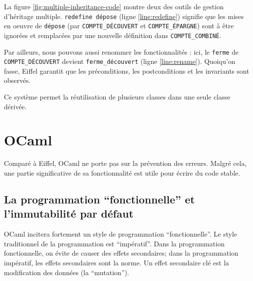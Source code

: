 \documentclass[french]{report}
\begin{document}
La figure \ref{fig:multiple-inheritance-code} montre deux des outils de gestion d'héritage multiple. \texttt{redefine dépose} (ligne \ref{line:redefine}) signifie que les mises en oeuvre de \texttt{dépose} (par \texttt{COMPTE\_DÉCOUVERT} et \texttt{COMPTE\_ÉPARGNE}) sont à être ignorées et remplacées par une nouvelle définition dans \texttt{COMPTE\_COMBINÉ}.

Par ailleurs, nous pouvons aussi renommer les fonctionnalités : ici, le \texttt{ferme} de \texttt{COMPTE\_DÉCOUVERT} devient \texttt{ferme\_découvert} (ligne \ref{line:rename}). Quoiqu'on fasse, Eiffel garantit que les préconditions, les postconditions et les invariants sont observés.

Ce système permet la réutilisation de plusieurs classes dans une seule classe dérivée.

\chapter{OCaml}

Comparé à Eiffel, OCaml ne porte pas sur la prévention des erreurs. Malgré cela, une partie significative de sa fonctionnalité est utile pour écrire du code stable.

\section{La programmation \enquote{fonctionnelle} et l'immutabilité par défaut}

OCaml incitera fortement un style de programmation \enquote{fonctionnelle}. Le style traditionnel de la programmation est \enquote{impératif}. Dans la programmation fonctionnelle, on évite de causer des effets secondaires; dans la programmation impératif, les effets secondaires sont la norme. Un effet secondaire clé est la modification des données (la \enquote{mutation}).
\end{document}
